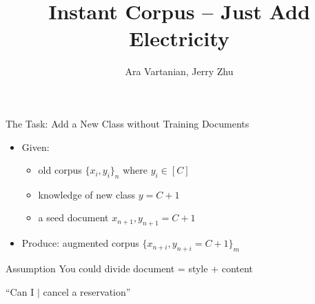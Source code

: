 \documentclass[12pt]{beamer}
\title{Instant Corpus -- Just Add Electricity}
\author[Author]{Ara Vartanian, Jerry Zhu}
\institute{Department of Computer Sciences, University of Wisconsin-Madison}
\begin{document}
\begin{frame}
  \titlepage
\end{frame}

\begin{frame}{The Task: Add a New Class without Training Documents}
\begin{itemize}
\item Given:
 \begin{itemize}
 \item old corpus $\{x_i, y_i\}_n$ where $y_i \in [C]$
 \item knowledge of new class $y=C+1$
 \item a seed document $x_{n+1}, y_{n+1}=C+1$
 \end{itemize}
\item Produce:
 augmented corpus $\{x_{n+i}, y_{n+i}=C+1\}_m$
\end{itemize}
\end{frame} 


\begin{frame}{Assumption}
  You could divide document = style + content
\\
\centerline{``Can I $\vert$ cancel a reservation''}
\end{frame} 





\end{document}
